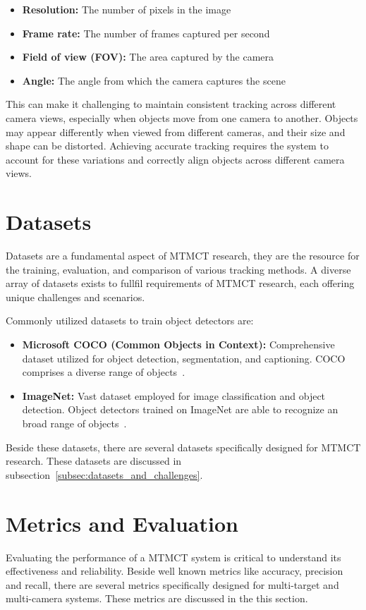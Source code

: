 \begin{itemize}
    \item \textbf{Resolution:} The number of pixels in the image
    \item \textbf{Frame rate:} The number of frames captured per second
    \item \textbf{Field of view (FOV):} The area captured by the camera
    \item \textbf{Angle:} The angle from which the camera captures the scene
\end{itemize}

This can make it challenging to maintain consistent tracking across different camera views, especially when objects move from one camera to another. Objects may appear differently when viewed from different cameras, and their size and shape can be distorted. Achieving accurate tracking requires the system to account for these variations and correctly align objects across different camera views.

\section{Datasets}\label{sec:datasets}
Datasets are a fundamental aspect of MTMCT research, they are the resource for the training, evaluation, and comparison of various tracking methods. A diverse array of datasets exists to fullfil requirements of MTMCT research, each offering unique challenges and scenarios.

Commonly utilized datasets to train object detectors are:

\begin{itemize}
    \item \textbf{Microsoft COCO (Common Objects in Context):} Comprehensive dataset utilized for object detection, segmentation, and captioning. COCO comprises a diverse range of objects~\cite{Lin14}.
    \item \textbf{ImageNet:} Vast dataset employed for image classification and object detection. Object detectors trained on ImageNet are able to recognize an broad range of objects~\cite{Deng09}.
\end{itemize}

Beside these datasets, there are several datasets specifically designed for MTMCT research. These datasets are discussed in subsection~\ref{subsec:datasets_and_challenges}.

\section{Metrics and Evaluation}\label{sec:metrics_and_evaluation}
Evaluating the performance of a MTMCT system is critical to understand its effectiveness and reliability. Beside well known metrics like accuracy, precision and recall, there are several metrics specifically designed for multi-target and multi-camera systems. These metrics are discussed in the this section.

